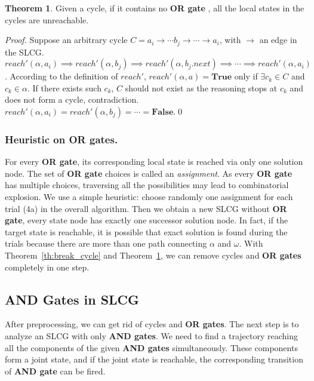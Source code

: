 \documentclass{article}
\theoremstyle{definition}
\newtheorem{theorem}{Theorem}
\begin{document}
\begin{theorem}\label{th:break_cycle2}
Given a cycle, if it contains no \textbf{OR gate}%
, all the local states in the cycles are unreachable.
\end{theorem}

\begin{proof}
Suppose an arbitrary cycle $C=a_i\to \cdots b_j\to\cdots \to a_i$, with $\to$ an edge in the SLCG.
$reach'(\alpha,a_i)\implies reach'(\alpha,b_j)\implies reach'(\alpha,b_j.next)\implies \cdots\implies reach'(\alpha,a_i)$.
According to the definition of $reach'$, $reach'(\alpha,a)=\mathbf{True}$ only if $\exists c_k\in C$ and $c_k\in \alpha$.
If there exists such $c_k$, $C$ should not exist as the reasoning stops at $c_k$ and does not form a cycle, contradiction.
$reach'(\alpha,a_i)=reach'(\alpha,b_j)=\cdots =\mathbf{False}$.\qed
\end{proof}

\subsubsection{Heuristic on OR gates.}\label{sec:OR}
For every \textbf{OR gate}, its corresponding local state is reached via only one solution node.
The set of \textbf{OR gate} choices is called an \textit{assignment}.
As every \textbf{OR gate} has multiple choices, traversing all the possibilities may lead to combinatorial explosion.
We use a simple heuristic: 
choose randomly one assignment for each trial (4a) in the overall algorithm.
Then we obtain a new SLCG without \textbf{OR gate}, every state node has exactly one successor solution node.
In fact, if the target state is reachable, it is possible that exact solution is found during the trials because there are more than one path connecting $\alpha$ and $\omega$.
With Theorem~\ref{th:break_cycle} and Theorem~\ref{th:break_cycle2}, we can remove cycles and \textbf{OR gates} completely in one step.

\subsection{AND Gates in SLCG}\label{sectAndGates}
After preprocessing, we can get rid of cycles and \textbf{OR gates}.
The next step is to analyze an SLCG with only \textbf{AND gates}.
We need to find a trajectory reaching all the components of the given \textbf{AND gates} simultaneously.
These components form a joint state, and if the joint state is reachable, the corresponding transition of \textbf{AND gate} can be fired. 
\end{document}
